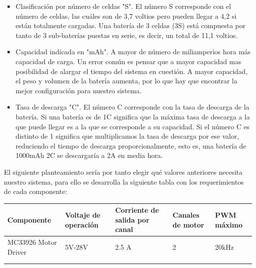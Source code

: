 \begin{itemize}
	\item Clasificación por número de celdas "S". El número S corresponde con el número de celdas, las cuáles son de 3,7 voltios pero pueden llegar a 4,2 si están totalmente cargadas. Una batería de 3 celdas (3S) está compuesta por tanto de 3 sub-baterías puestas en serie, es decir, un total de 11,1 voltios.
	\item Capacidad indicada en "mAh". A mayor de número de miliamperios hora más capacidad de carga. Un error común es pensar que a mayor capacidad mas posibilidad de alargar el tiempo del sistema en cuestión. A mayor capacidad, el peso y volumen de la batería aumenta, por lo que hay que encontrar la mejor configuración para nuestro sistema. 
	\item Tasa de descarga "C". El número C corresponde con la tasa de descarga de la batería. Si una batería es de 1C significa que la máxima tasa de descarga a la que puede llegar es a la que se corresponde a su capacidad. Si el número C es distinto de 1 significa que multiplicamos la tasa de descarga por ese valor, reduciendo el tiempo de descarga proporcionalmente, esto es, una batería de 1000mAh 2C se descargaría a 2A en media hora.
\end{itemize}

El siguiente planteamiento sería por tanto elegir qué valores anteriores necesita nuestro sistema, para ello se desarrolla la siguiente tabla con los requerimientos de cada componente:

\begin{table}[H]
	\begin{tabular}{lllll}
		\hline
		\multicolumn{1}{|l|}{Componente}           & \multicolumn{1}{l|}{Voltaje de operación} & \multicolumn{1}{l|}{Corriente de salida por canal} & \multicolumn{1}{l|}{Canales de motor} & \multicolumn{1}{l|}{PWM máximo} \\ \hline
		\multicolumn{1}{|l|}{MC33926 Motor Driver} & \multicolumn{1}{l|}{5V-28V}               & \multicolumn{1}{l|}{2.5 A}                         & \multicolumn{1}{l|}{2}                & \multicolumn{1}{l|}{20kHz}      \\ \hline
		&                                           &                                                    &                                       &                                 \\
		&                                           &                                                    &                                       &                                
	\end{tabular}
\end{table}

